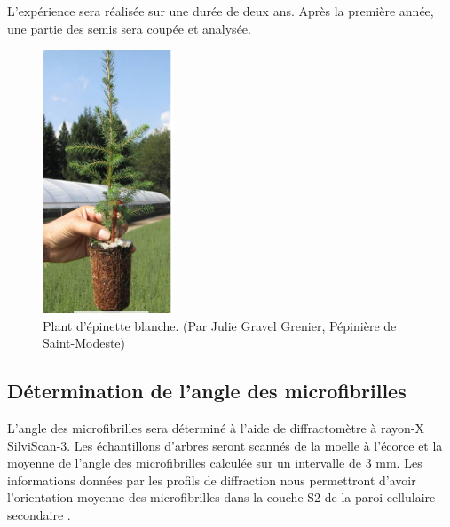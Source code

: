 \documentclass{report}
\begin{document}

 L'expérience sera réalisée sur une durée de deux ans. Après la première année, une partie des semis sera coupée et analysée.\\


\begin{figure}
	
	\centering
	\includegraphics[width=0.35\textwidth]{plant_epinette.png}
	\caption{Plant d'épinette blanche. (Par Julie Gravel Grenier, Pépinière de Saint-Modeste)}
	\label{plant}	
	
\end{figure}



\subsection*{Détermination de l'angle des microfibrilles}
L'angle des microfibrilles sera déterminé à l'aide de diffractomètre à rayon-X SilviScan-3. Les échantillons d'arbres seront scannés de la moelle à l'écorce et la moyenne de l'angle des microfibrilles calculée sur un intervalle de 3 mm. 
Les informations données par les profils de diffraction nous permettront d'avoir l'orientation moyenne des microfibrilles dans la couche S2 de la paroi cellulaire secondaire \citep{Evans1999}. %
\end{document}
